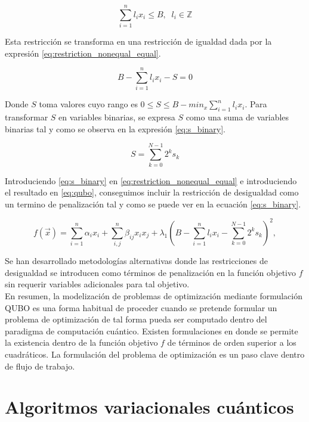 \begin{equation}
    \sum_{i=1}^nl_ix_i \leq B, \; \; l_i \in \mathbb{Z}
    \label{eq:restriction_inequality}
\end{equation}

Esta restricción se transforma en una restricción de igualdad dada por la expresión \ref{eq:restriction_nonequal_equal}.

\begin{equation}
    B - \sum_{i=1}^n l_ix_i - S = 0
    \label{eq:restriction_nonequal_equal}
\end{equation}

Donde $S$ toma valores cuyo rango es $0 \leq S \leq B - min_x \sum_{i=1}^n l_ix_i$. Para transformar $S$ en variables binarias, se expresa $S$ como una suma de variables binarias tal y como se observa en la expresión \ref{eq:s_binary}.

\begin{equation}
    S = \sum_{k=0}^{N-1}2^ks_k
    \label{eq:s_binary}
\end{equation}

Introduciendo \ref{eq:s_binary} en  \ref{eq:restriction_nonequal_equal} e introduciendo el resultado en \ref{eq:qubo}, conseguimos incluir la restricción de desigualdad como un termino de penalización tal y como se puede ver en la ecuación  \ref{eq:s_binary}.

\begin{equation}
    f(\Vec{x}) = \sum_{i=1}^{n} \alpha_{i} x_{i} + \sum_{i,j}^{n} \beta_{ij} x_{i} x_{j} + \lambda_1 (B - \sum_{i=1}^n l_ix_i - \sum_{k=0}^{N-1}2^ks_k)^2,
    \label{eq:s_binary}
\end{equation}

Se han desarrollado metodologías alternativas \citep{montañez} donde las restricciones de desigualdad se introducen como términos de penalización en la función objetivo $f$ sin requerir variables adicionales para tal objetivo. \\

En resumen, la modelización de problemas de optimización mediante formulación QUBO es una forma habitual de proceder cuando se pretende formular un problema de optimización de tal forma pueda ser computado dentro del paradigma de computación cuántico. Existen formulaciones en donde se permite la existencia dentro de la función objetivo $f$ de términos de orden superior a los cuadráticos. La formulación del problema de optimización es un paso clave dentro de flujo de trabajo.


\section{Algoritmos variacionales cuánticos}

